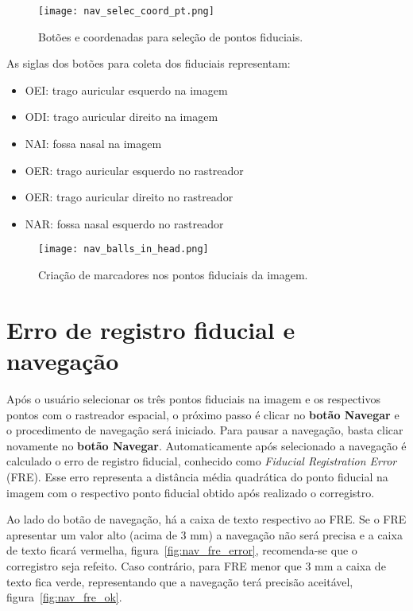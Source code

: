 \begin{figure}[!htb]
\centering
\texttt{[image: nav\_selec\_coord\_pt.png]}
\caption{Botões e coordenadas para seleção de pontos fiduciais.}
\label{fig:nav_selec_coord}
\end{figure}

As siglas dos botões para coleta dos fiduciais representam:

\begin{itemize}
	\item OEI: trago auricular esquerdo na imagem
	\item ODI: trago auricular direito na imagem
	\item NAI: fossa nasal na imagem
	\item OER: trago auricular esquerdo no rastreador
	\item OER: trago auricular direito no rastreador
	\item NAR: fossa nasal esquerdo no rastreador
\end{itemize}

\begin{figure}[!htb]
\centering
\texttt{[image: nav\_balls\_in\_head.png]}
\caption{Criação de marcadores nos pontos fiduciais da imagem.}
\label{fig:nav_balls_in_head}
\end{figure}


\section{Erro de registro fiducial e navegação}

Após o usuário selecionar os três pontos fiduciais na imagem e os respectivos pontos com o rastreador espacial, o próximo passo é clicar no \textbf{botão Navegar} e o procedimento de navegação será iniciado. Para pausar a navegação, basta clicar novamente no \textbf{botão Navegar}. Automaticamente após selecionado a navegação é calculado o erro de registro fiducial, conhecido como \textit{Fiducial Registration Error} (FRE). Esse erro representa a distância média quadrática do ponto fiducial na imagem com o respectivo ponto fiducial obtido após realizado o corregistro. 

Ao lado do botão de navegação, há a caixa de texto respectivo ao FRE. Se o FRE apresentar um valor alto (acima de 3 mm) a navegação não será precisa e a caixa de texto ficará vermelha, figura~\ref{fig:nav_fre_error}, recomenda-se que o corregistro seja refeito. Caso contrário, para FRE menor que 3 mm a caixa de texto fica verde, representando que a navegação terá precisão aceitável, figura~\ref{fig:nav_fre_ok}.

